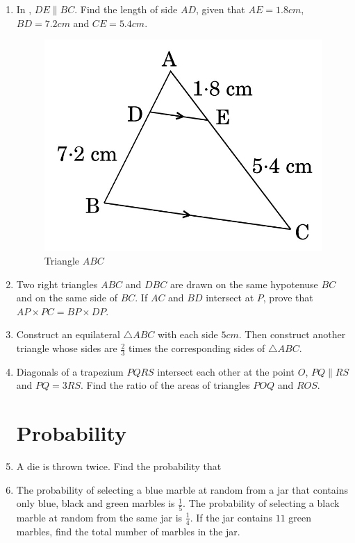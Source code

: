 \documentclass[2pt,-letter paper]{article}
\begin{document}
\begin{enumerate}
\item In  , $DE \parallel BC$. Find the length of side $AD$, given that $AE = 1.8 cm$, $ BD = 7.2 cm$ and $ CE = 5.4 cm$.
\begin{figure}[H]
    \centering
    \includegraphics[width=\columnwidth]{img2.jpg}
    \caption{Triangle $ABC$ }
    \label{fig:Fig_2}
\end{figure}

\item Two right triangles $ABC$ and $DBC$ are drawn on the same hypotenuse $BC$ and on the same side of $BC$. If $AC$ and $BD$ intersect at $P$, prove that $AP \times PC = BP \times DP$.

\item Construct an equilateral $\triangle ABC$ with each side $5 cm$. Then construct another triangle whose sides are $\frac{2}{3}$ times the corresponding sides of $\triangle ABC$.

\item Diagonals of a trapezium $PQRS$ intersect each other at the point $O$,
$PQ \parallel RS$ and $PQ = 3RS$. Find the ratio of the areas of triangles $POQ$ and $ROS$.



 \section{Probability}

\item A die is thrown twice. Find the probability that
\begin{enumerate}
\end{enumerate}

\item The probability of selecting a blue marble at random from a jar that contains only blue, black and green marbles is $\frac{1}{5}$. The probability of selecting a black marble at random from the same jar is $\frac{1}{4}$. If the jar contains $11$ green marbles, find the total number of marbles in the jar.

\end{enumerate}
\end{document}
